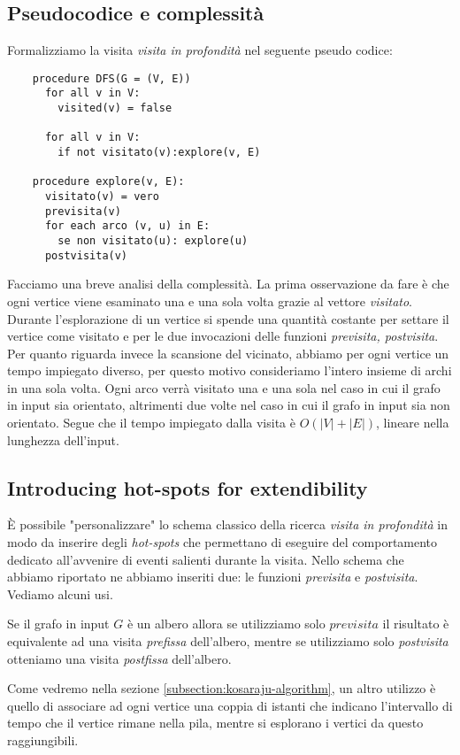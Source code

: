 \subsection{Pseudocodice e complessit\`a}
Formalizziamo la visita \emph{visita in profondit\`a} nel seguente pseudo
codice:
\begin{lstlisting}
    procedure DFS(G = (V, E))
      for all v in V:
        visited(v) = false

      for all v in V:
        if not visitato(v):explore(v, E)

    procedure explore(v, E):
      visitato(v) = vero
      previsita(v)
      for each arco (v, u) in E:
        se non visitato(u): explore(u)
      postvisita(v)
\end{lstlisting}

Facciamo una breve analisi della complessit\`a. La prima osservazione
da fare \`e che ogni vertice viene esaminato una e una sola volta
grazie al vettore \emph{visitato}. Durante l'esplorazione di un vertice
si spende una quantit\`a costante per settare il vertice come visitato
e per le due invocazioni delle funzioni \emph{previsita,
  postvisita}. Per quanto riguarda invece la scansione del vicinato,
abbiamo per ogni vertice un tempo impiegato diverso, per questo motivo
consideriamo l'intero insieme di archi in una sola volta. Ogni arco
verr\`a visitato una e una sola nel caso in cui il grafo in input sia
orientato, altrimenti due volte nel caso in cui il grafo in input sia
non orientato. Segue che il tempo impiegato dalla visita \`e $O(|V| +
|E|)$, lineare nella lunghezza dell'input.

\subsection{Introducing hot-spots for extendibility}
\`E possibile "personalizzare" lo schema classico della ricerca
\emph{visita in profondit\`a} in modo da inserire degli \emph{hot-spots}
che permettano di eseguire del comportamento dedicato all'avvenire di
eventi salienti durante la visita. Nello schema che abbiamo riportato
ne abbiamo inseriti due: le funzioni \emph{previsita} e
\emph{postvisita}. Vediamo alcuni usi.

Se il grafo in input $G$ \`e un albero allora se utilizziamo solo
$previsita$ il risultato \`e equivalente ad una visita \emph{prefissa}
dell'albero, mentre se utilizziamo solo \emph{postvisita} otteniamo una
visita \emph{postfissa} dell'albero.

Come vedremo nella sezione \ref{subsection:kosaraju-algorithm}, un
altro utilizzo \`e quello di associare ad ogni vertice una coppia di
istanti che indicano l'intervallo di tempo che il vertice rimane nella
pila, mentre si esplorano i vertici da questo raggiungibili.

